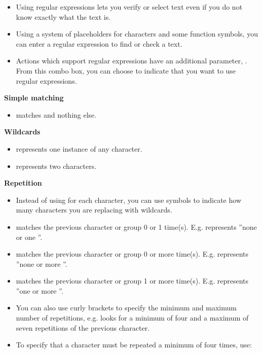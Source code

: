 \newcommand{\gdregex}[3]{%
#1 & #2 & #3 \\%
}%

\newcommand{\bxcarat}{\verb+^+}
\begin{itemize}
\item Using regular expressions lets you verify or select text even if you do not know exactly what the text is.
\item Using a system of placeholders for characters and some function symbols, you can enter a regular expression to find or check a text.
\item Actions which support regular expressions have an additional parameter, . From this combo box, you can choose   to indicate that you want to use regular expressions.
\end{itemize}

\textbf{Simple matching}
\begin{itemize}
\item {} matches  and nothing else.
\end{itemize}

\textbf{Wildcards}
\begin{itemize}
\item {} represents one instance of any character.
\item {} represents two characters.  
\end{itemize}

\textbf{Repetition}
\begin{itemize}
\item Instead of using  for each character, you can use symbols to indicate how many characters you are replacing with wildcards.
\item {} matches the previous character or group 0 or 1 time(s). E.g.  represents ''none or one ''.
\item \bxshell{*} matches the previous character or group 0 or more time(s). E.g.  represents ''none or more ''.
\item \bxshell{+} matches the previous character or group 1 or more time(s). E.g.  represents ''one or more ''.
\item You can also use curly brackets \bxshell{\{\}}  to specify the minimum and maximum number of repetitions, e.g.  looks for a minimum of four and a maximum of seven repetitions of the previous character.
\item To specify that a character must be repeated a minimum of four times, use: 
\end{itemize}

